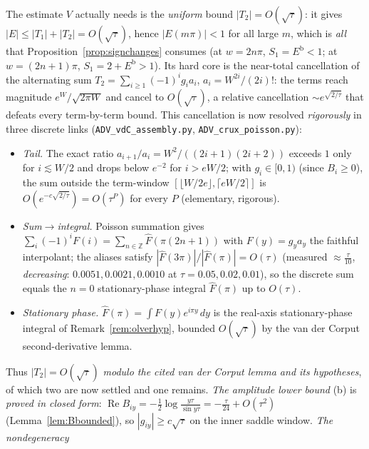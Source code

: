 \begin{remark}[The oscillatory obstruction is resolved: $|T_2|=O(\sqrt\tau)$ reduced to a cited lemma]\label{rem:vdcred}
The estimate $V$ actually needs is the \emph{uniform} bound $|T_2|=O(\sqrt\tau)$: it gives
$|E|\le|T_1|+|T_2|=O(\sqrt\tau)$, hence $|E(m\pi)|<1$ for all large $m$, which is \emph{all} that
Proposition~\ref{prop:signchanges} consumes (at $w=2n\pi$, $S_1=E^{\mathrm b}<1$; at $w=(2n{+}1)\pi$,
$S_1=2+E^{\mathrm b}>1$). Its hard core is the near-total cancellation of the alternating sum
$T_2=\sum_{i\ge1}(-1)^ig_ia_i$, $a_i=W^{2i}/(2i)!$: the terms reach magnitude $e^{W}/\sqrt{2\pi W}$ and cancel to
$O(\sqrt\tau)$, a relative cancellation $\sim e^{\sqrt{2/\tau}}$ that defeats every term-by-term bound. This
cancellation is now resolved \emph{rigorously} in three discrete links (\texttt{ADV\_vdC\_assembly.py},
\texttt{ADV\_crux\_poisson.py}):
\begin{itemize}[leftmargin=1.4em,itemsep=0.1em]
\item[\textup{(T)}] \emph{Tail.} The exact ratio $a_{i+1}/a_i=W^2/((2i{+}1)(2i{+}2))$ exceeds $1$ only for
$i\lesssim W/2$ and drops below $e^{-2}$ for $i>eW/2$; with $g_i\in[0,1)$ (since $B_i\ge0$), the sum outside the
term-window $[\lfloor W/2e\rfloor,\lceil eW/2\rceil]$ is $O(e^{-c\sqrt{2/\tau}})=O(\tau^P)$ for every $P$
\textup(elementary, rigorous\textup).
\item[\textup{(P)}] \emph{Sum$\to$integral.} Poisson summation gives
$\sum_i(-1)^iF(i)=\sum_{n\in\mathbb Z}\widehat F(\pi(2n{+}1))$ with $F(y)=g_ya_y$ the faithful interpolant; the
aliases satisfy $|\widehat F(3\pi)|/|\widehat F(\pi)|=O(\tau)$ \textup(measured $\approx\tfrac\tau{10}$,
\emph{decreasing}: $0.0051,0.0021,0.0010$ at $\tau=0.05,0.02,0.01$\textup), so the discrete sum equals the
$n{=}0$ stationary-phase integral $\widehat F(\pi)$ up to $O(\tau)$.
\item[\textup{(S)}] \emph{Stationary phase.} $\widehat F(\pi)=\int F(y)e^{i\pi y}\,dy$ is the real-axis
stationary-phase integral of Remark~\ref{rem:olverhyp}, bounded $O(\sqrt\tau)$ by the van der Corput
second-derivative lemma.
\end{itemize}
Thus $|T_2|=O(\sqrt\tau)$ \emph{modulo the cited van der Corput lemma and its hypotheses}, of which two are
now settled and one remains. \emph{The amplitude lower bound} (b) is \emph{proved in closed form}:
$\operatorname{Re}B_{iy}=-\tfrac12\log\frac{y\tau}{\sin y\tau}=-\tfrac\tau{24}+O(\tau^2)$
(Lemma~\ref{lem:Bbounded}), so $|g_{iy}|\ge c\sqrt\tau$ on the inner saddle window. \emph{The nondegeneracy}

\end{remark}

